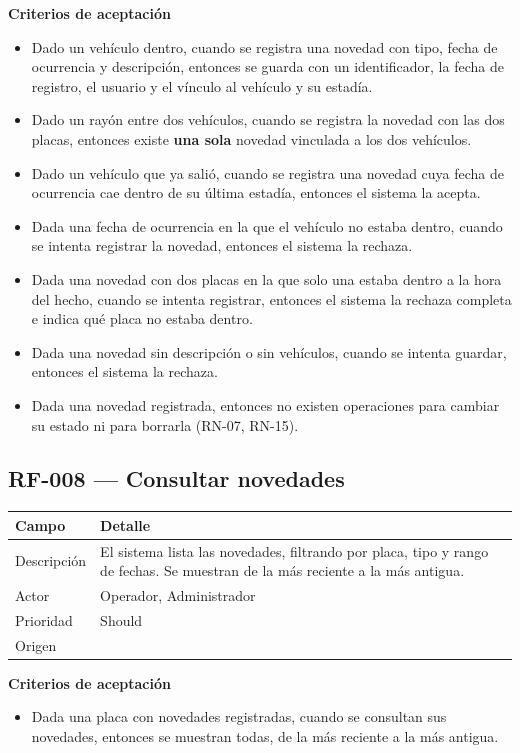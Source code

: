 \textbf{Criterios de aceptación}
\begin{itemize}
  \item Dado un vehículo dentro, cuando se registra una novedad con tipo, fecha de ocurrencia y descripción, entonces se guarda con un identificador, la fecha de registro, el usuario y el vínculo al vehículo y su estadía.
  \item Dado un rayón entre dos vehículos, cuando se registra la novedad con las dos placas, entonces existe \textbf{una sola} novedad vinculada a los dos vehículos.
  \item Dado un vehículo que ya salió, cuando se registra una novedad cuya fecha de ocurrencia cae dentro de su última estadía, entonces el sistema la acepta.
  \item Dada una fecha de ocurrencia en la que el vehículo no estaba dentro, cuando se intenta registrar la novedad, entonces el sistema la rechaza.
  \item Dada una novedad con dos placas en la que solo una estaba dentro a la hora del hecho, cuando se intenta registrar, entonces el sistema la rechaza completa e indica qué placa no estaba dentro.
  \item Dada una novedad sin descripción o sin vehículos, cuando se intenta guardar, entonces el sistema la rechaza.
  \item Dada una novedad registrada, entonces no existen operaciones para cambiar su estado ni para borrarla (RN-07, RN-15).
\end{itemize}

\subsection{RF-008 — Consultar novedades}
\begin{longtable}{>{\raggedright\arraybackslash}p{3.2cm}>{\raggedright\arraybackslash}p{11.2cm}}
\toprule
\textbf{Campo} & \textbf{Detalle}\\
\midrule\endhead
Descripción & El sistema lista las novedades, filtrando por placa, tipo y rango de fechas. Se muestran de la más reciente a la más antigua.\\
Actor & Operador, Administrador\\
Prioridad & Should\\
Origen & [I]\\
\bottomrule
\end{longtable}

\textbf{Criterios de aceptación}
\begin{itemize}
  \item Dada una placa con novedades registradas, cuando se consultan sus novedades, entonces se muestran todas, de la más reciente a la más antigua.
\end{itemize}

